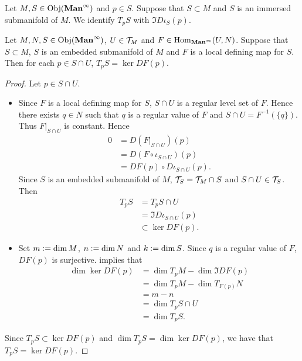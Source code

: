 \documentclass{book}
\begin{document}
	
	\begin{defn} 
		Let $M, S \in \operatorname{Obj}(\operatorname*{\text{\textbf{Man}}^{\infty}})$ and $p \in S$. Suppose that $S \subset M$ and $S$ is an immersed submanifold of $M$. We identify $T_pS$ with $\Im D\iota_S(p)$. 
	\end{defn}
	
	\begin{ex} 
		Let $M, N, S \in \operatorname{Obj}(\operatorname*{\text{\textbf{Man}}^{\infty}})$, $U \in \mathcal{T}_M$ and $F \in \operatorname{Hom}_{\operatorname*{\text{\textbf{Man}}^{\infty}}}(U, N)$. Suppose that $S \subset M$, $S$ is an embedded submanifold of $M$ and $F$ is a local defining map for $S$. Then for each $p \in S \cap U$, $T_pS = \ker D F(p)$. 
	\end{ex}
	
	\begin{proof}
		Let $p \in S \cap U$.
		\begin{itemize}
			\item Since $F$ is a local defining map for $S$, $S \cap U$ is a regular level set of $F$. Hence there exists $q \in N$ such that $q$ is a regular value of $F$ and $S \cap U = F^{-1}(\{q\})$. Thus $F|_{S \cap U}$ is constant. Hence
			\begin{align*}
				0
				& = D(F|_{S \cap U})(p) \\
				& = D(F \circ \iota_{S \cap U})(p) \\
				& = DF(p) \circ D \iota_{S \cap U}(p).
			\end{align*} 
			Since $S$ is an embedded submanifold of $M$, $\mathcal{T}_S = \mathcal{T}_M \cap S$ and $S \cap U \in \mathcal{T}_S$. Then
			\begin{align*}
				T_p S
				& = T_p S \cap U \\
				& = \Im D\iota_{S \cap U} (p) \\
				& \subset \ker DF(p).
			\end{align*}
			\item Set $m \vcentcolon= \dim M$, $n \vcentcolon= \dim N$ and $k \vcentcolon= \dim S$. Since $q$ is a regular value of $F$, $DF(p)$ is surjective. \rex{}  implies that
			\begin{align*}
				\dim \ker DF(p)
				& = \dim T_pM - \dim \Im DF(p) \\
				& = \dim T_pM - \dim T_{F(p)}N \\
				& = m - n \\
				& = \dim T_p S \cap U \\
				& = \dim T_p S.
			\end{align*}
		\end{itemize}
		Since $T_p S \subset \ker DF(p)$ and $\dim T_p S = \dim \ker DF(p)$, we have that $T_pS = \ker D F(p)$. 
	\end{proof}
\end{document}
